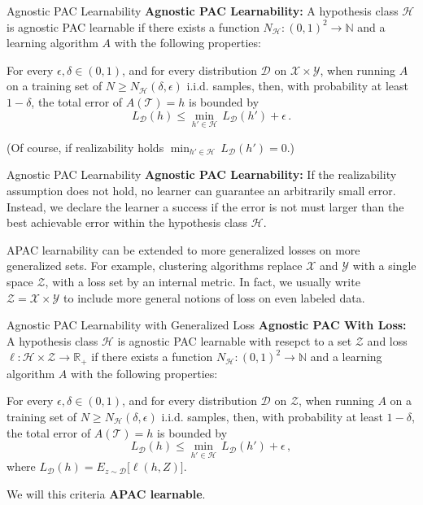 \documentclass[10pt, table, handout]{beamer}
\newcommand{\cT}{\ensuremath{\mathcal{T}}}
\newcommand{\cD}{\ensuremath{\mathcal{D}}}
\newcommand{\cX}{\ensuremath{\mathcal{X}}}
\newcommand{\cY}{\ensuremath{\mathcal{Y}}}
\newcommand{\cZ}{\ensuremath{\mathcal{Z}}}
\newcommand{\cH}{\ensuremath{\mathcal{H}}}
\newcommand{\bR}{\ensuremath{\mathbb{R}}}
\begin{document}
\begin{frame}[fragile]{Agnostic PAC Learnability}
\textbf{Agnostic PAC Learnability:} A hypothesis class $\cH$ is agnostic PAC learnable if there exists a function $N_{\mathcal{H}}:(0,1)^2\to \mathbb{N}$ and a learning algorithm $A$ with the following properties:\newline\pause

For every $\epsilon, \delta\in (0,1)$, and for every distribution $\mathcal{D}$ on $\cX\times\cY$, when running $A$ on a training set of $N\geq N_\cH(\delta,\epsilon)$ i.i.d. samples, then, with probability at least $1-\delta$, the total error of $A(\cT) = h$ is bounded by
$$
L_{\cD}(h)\leq\min_{h'\in \mathcal{H}}\,L_{\cD}(h')+\epsilon\,.
$$ 
\pause\newline

(Of course, if realizability holds $\min_{h'\in \mathcal{H}}\,L_{\cD}(h') = 0$.)
\end{frame}



\begin{frame}[fragile]{Agnostic PAC Learnability}
\textbf{Agnostic PAC Learnability:} If the realizability assumption does not hold, no learner can guarantee an arbitrarily small error. Instead, we declare the learner a success if the error is not must larger than the best achievable error within the hypothesis class $\mathcal{H}$.\pause

APAC learnability can be extended to more generalized losses on more generalized sets. For example,  clustering algorithms replace $\mathcal{X}$ and $\mathcal{Y}$ with a single space $\mathcal{Z}$, with a loss set by an internal metric. In fact, we usually write $\mathcal{Z} = \mathcal{X}\times \mathcal{Y}$ to include more general notions of loss on even labeled data. 
\end{frame}






\begin{frame}[fragile]{Agnostic PAC Learnability with Generalized Loss}
\textbf{Agnostic PAC With Loss:} A hypothesis class $\cH$ is agnostic PAC learnable with resepct to a set $\cZ$ and loss $\ell:\cH\times \cZ\to \bR_+$ if there exists a function $N_{\mathcal{H}}:(0,1)^2\to \mathbb{N}$ and a learning algorithm $A$ with the following properties:\newline\pause

For every $\epsilon, \delta\in (0,1)$, and for every distribution $\mathcal{D}$ on $\cZ$, when running $A$ on a training set of $N\geq N_\cH(\delta,\epsilon)$ i.i.d. samples, then, with probability at least $1-\delta$, the total error of $A(\cT) = h$ is bounded by
$$
L_{\cD}(h)\leq\min_{h'\in \mathcal{H}}\,L_{\cD}(h')+\epsilon\,,
$$ 
where $L_{\cD}(h) = E_{z\sim\cD}\big[\ell(h,Z)\big]$.\pause

We will this criteria \textbf{APAC learnable}. 
\end{frame}
\end{document}
